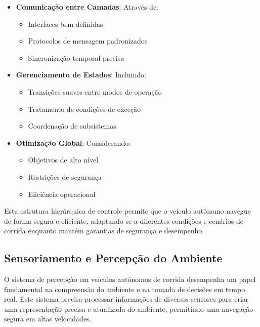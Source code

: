 \begin{itemize}
    \item \textbf{Comunicação entre Camadas}: Através de:
          \begin{itemize}
              \item Interfaces bem definidas
              \item Protocolos de mensagem padronizados
              \item Sincronização temporal precisa
          \end{itemize}

    \item \textbf{Gerenciamento de Estados}: Incluindo:
          \begin{itemize}
              \item Transições suaves entre modos de operação
              \item Tratamento de condições de exceção
              \item Coordenação de subsistemas
          \end{itemize}

    \item \textbf{Otimização Global}: Considerando:
          \begin{itemize}
              \item Objetivos de alto nível
              \item Restrições de segurança
              \item Eficiência operacional
          \end{itemize}
\end{itemize}

Esta estrutura hierárquica de controle permite que o veículo autônomo navegue
de forma segura e eficiente, adaptando-se a diferentes condições e cenários de
corrida enquanto mantém garantias de segurança e desempenho.

\subsection{Sensoriamento e Percepção do Ambiente}

O sistema de percepção em veículos autônomos de corrida desempenha um papel
fundamental na compreensão do ambiente e na tomada de decisões em tempo real.
Este sistema precisa processar informações de diversos sensores para criar uma
representação precisa e atualizada do ambiente, permitindo uma navegação segura
em altas velocidades.

